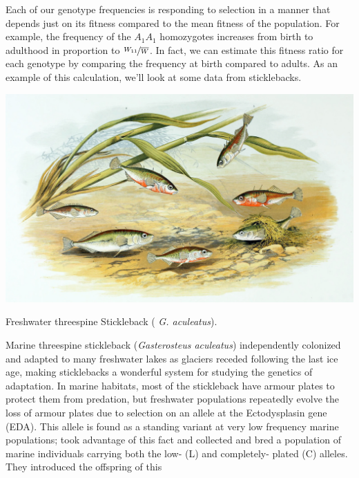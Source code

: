 Each of our genotype frequencies is responding to selection in a
manner that depends just on its fitness compared to the mean fitness
of the population. For example, the frequency of the $A_1A_1$ homozygotes
increases from birth to adulthood in proportion to $\nicefrac{W_{11}}{\overline{W}}$. In
fact, we can estimate this fitness ratio for each genotype by comparing
the frequency at birth compared to adults. As an example of this calculation, we'll
look at some data from sticklebacks. 
\begin{marginfigure}
\begin{center}
\includegraphics[width= 1.2 \textwidth]{illustration_images/single_locus_selection/Stickleback/Gasterosteus_aculeatus_1879.jpg}
\end{center}
\caption{Freshwater threespine Stickleback ({\it
    G. aculeatus}). } \label{fig:stickleback}
\end{marginfigure}
Marine threespine stickleback ({\it Gasterosteus aculeatus})
independently colonized and adapted to many freshwater lakes
as glaciers receded following the last ice age, making sticklebacks a wonderful system for studying the genetics of adaptation. In marine habitats, most of the stickleback have armour plates to protect them
from predation, but freshwater populations repeatedly evolve the
loss of armour plates due to selection on an allele at the
Ectodysplasin gene (EDA).  This allele is found as a standing variant at very low frequency marine populations;
\citet{Barrett:08} took advantage of this fact and collected and bred
a population of marine individuals carrying both the low- (L) and
completely- plated (C) alleles. They introduced the offspring of this
